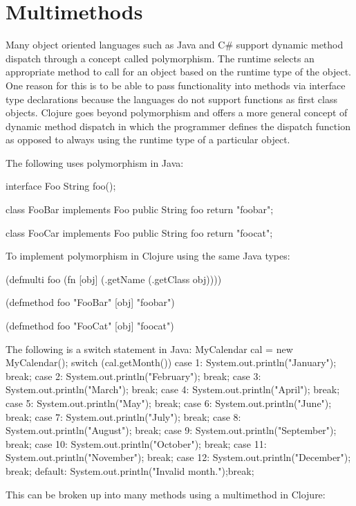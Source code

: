 \section{Multimethods}
Many object oriented languages such as Java and C\# support dynamic method dispatch through a concept called polymorphism. The runtime selects an appropriate method to call for an object based on the runtime type of the object. One reason for this is to be able to pass functionality into methods via interface type declarations because the languages do not support functions as first class objects. 
Clojure goes beyond polymorphism and offers a more general concept of dynamic method dispatch in which the programmer defines
the dispatch function as opposed to always using the runtime type of a particular object. 

The following uses polymorphism in Java:

interface Foo { 
	String foo(); 
}

class FooBar implements Foo {
        public String foo { return "foobar"; }
}

class FooCar implements Foo {
        public String foo { return "foocat"; }
}

To implement polymorphism in Clojure using the same Java types:

(defmulti foo (fn [obj] (.getName (.getClass obj))))

(defmethod foo "FooBar" [obj] "foobar")

(defmethod foo "FooCat" [obj] "foocat")

The following is a switch statement in Java:
MyCalendar cal = new MyCalendar();
switch (cal.getMonth()) {
            case 1:  System.out.println("January"); break;
            case 2:  System.out.println("February"); break;
            case 3:  System.out.println("March"); break;
            case 4:  System.out.println("April"); break;
            case 5:  System.out.println("May"); break;
            case 6:  System.out.println("June"); break;
            case 7:  System.out.println("July"); break;
            case 8:  System.out.println("August"); break;
            case 9:  System.out.println("September"); break;
            case 10: System.out.println("October"); break;
            case 11: System.out.println("November"); break;
            case 12: System.out.println("December"); break;
            default: System.out.println("Invalid month.");break;
        }

This can be broken up into many methods using a multimethod in Clojure:

